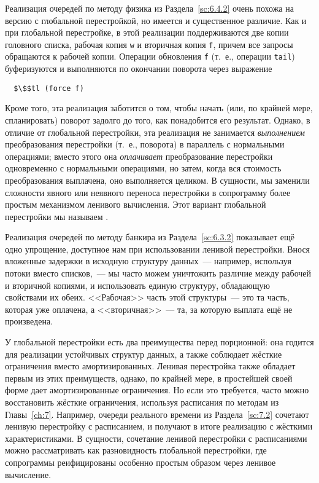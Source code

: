 Реализация очередей по методу физика из Раздела~\ref{sc:6.4.2} очень
похожа на версию с глобальной перестройкой, но имеется и существенное
различие. Как и при глобальной перестройке, в этой реализации
поддерживаются две копии головного списка, рабочая копия \lstinline!w!
и вторичная копия \lstinline!f!, причем все запросы обращаются к
рабочей копии. Операции обновления \lstinline!f! (т.~е., операции
\lstinline!tail!) буферизуются и выполняются по окончании поворота
через выражение
\begin{lstlisting}
  $\$$tl (force f)
\end{lstlisting}
Кроме того, эта реализация заботится о том, чтобы начать
(или, по крайней мере, спланировать) поворот задолго до того, как
понадобится его результат. Однако, в отличие от глобальной
перестройки, эта реализация не занимается \emph{выполнением}
преобразования перестройки (т.~е., поворота) в параллель с нормальными
операциями; вместо этого она \emph{оплачивает} преобразование
перестройки одновременно с нормальными операциями, но затем, когда вся
стоимость преобразования выплачена, оно выполняется целиком. В
сущности, мы заменили сложности явного или неявного переноса
перестройки в сопрограмму более простым механизмом ленивого
вычисления. Этот вариант глобальной перестройки мы называем
.

Реализация очередей по методу банкира из Раздела~\ref{sc:6.3.2}
показывает ещё одно упрощение, доступное нам при использовании ленивой
перестройки. Внося вложенные задержки в исходную структуру данных~---
например, используя потоки вместо списков,~--- мы часто можем
уничтожить различие между рабочей и вторичной копиями, и использовать
единую структуру, обладающую свойствами их обеих. <<Рабочая>> часть
этой структуры~--- это та часть, которая уже оплачена, а
<<вторичная>>~--- та, за которую выплата ещё не произведена.

У глобальной перестройки есть два преимущества перед 
порционной: она годится для реализации устойчивых структур данных, а
также соблюдает жёсткие ограничения вместо амортизированных. Ленивая
перестройка также обладает первым из этих преимуществ, однако, по
крайней мере, в простейшей своей форме дает амортизированные
ограничения. Но если это требуется, часто можно восстановить
жёсткие ограничения, используя расписания по методам из
Главы~\ref{ch:7}. Например, очереди реального времени из
Раздела~\ref{sc:7.2} сочетают ленивую перестройку с расписанием, и
получают в итоге реализацию с жёсткими характеристиками. В сущности,
сочетание ленивой перестройки с расписаниями можно рассматривать как
разновидность глобальной перестройки, где сопрограммы реифицированы
особенно простым образом через ленивое вычисление.

